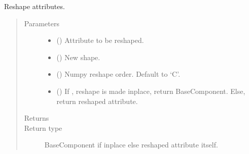 \documentclass[letterpaper,10pt,english]{sphinxmanual}
\begin{document}
\begin{fulllineitems}
\begin{fulllineitems}
\label{\detokenize{api/base_classes:geology.src.base_component.BaseComponent.reshape}}
Reshape  attributes.
\begin{quote}\begin{description}
\item[{Parameters}] \leavevmode\begin{itemize}
\item {} 
 (\sphinxstyleliteralemphasis{\sphinxupquote{, }}) \textendash{} Attribute to be reshaped.

\item {} 
 () \textendash{} New shape.

\item {} 
 () \textendash{} Numpy reshape order. Default to ‘C’.

\item {} 
 () \textendash{} If , reshape is made inplace, return BaseComponent.
Else, return reshaped attribute.

\end{itemize}

\item[{Returns}] \leavevmode
{}

\item[{Return type}] \leavevmode
BaseComponent if inplace else reshaped attribute itself.

\end{description}\end{quote}

\end{fulllineitems}


\end{fulllineitems}
\end{document}
